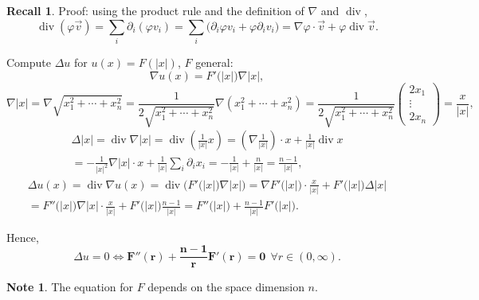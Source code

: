 \documentclass[12pt]{article}
\DeclareMathOperator{\diver}{div}
\theoremstyle{definition}
\newtheorem*{note}{Note}
\newtheorem*{recall}{Recall}
\begin{document}
\begin{recall}
Proof: using the product rule and the definition of $\nabla$ and $\diver$,
\[\diver(\varphi\vec v)=\sum_i\partial_i(\varphi v_i)=\sum_i\big(\partial_i\varphi v_i+\varphi\partial_iv_i\big)=\nabla\varphi\cdot\vec v+\varphi\diver\vec v.\]
\end{recall}

Compute $\Delta u$ for $u(x)=F(|x|)$, $F$ general:
\[\nabla u(x)=F'\big(|x|\big)\nabla|x|,\]
\[\nabla|x|=\nabla\sqrt{x_1^2+\cdots+x_n^2}=\frac1{2\sqrt{x_1^2+\cdots+x_n^2}}\nabla(x_1^2+\cdots+x_n^2)=\frac1{2\sqrt{x_1^2+\cdots+x_n^2}}\left(\begin{matrix}2x_1\\\vdots\\2x_n\end{matrix}\right)=\frac x{|x|},\]
\begin{multline*}
\Delta|x|=\diver\nabla|x|=\diver\left(\frac1{|x|}x\right)=\left(\nabla\frac1{|x|}\right)\cdot x+\frac1{|x|}\diver x\\
=-\frac1{|x|^2}\nabla|x|\cdot x+\frac1{|x|}\sum_i\partial_ix_i=-\frac1{|x|}+\frac n{|x|}=\frac{n-1}{|x|},
\end{multline*}
\begin{multline*}
\Delta u(x)=\diver\nabla u(x)=\diver\big(F'\big(|x|\big)\nabla|x|\big)=\nabla F'\big(|x|\big)\cdot\frac x{|x|}+F'\big(|x|\big)\Delta|x|\\
=F''\big(|x|\big)\nabla|x|\cdot\frac x{|x|}+F'\big(|x|\big)\frac{n-1}{|x|}=F''\big(|x|\big)+\frac{n-1}{|x|}F'\big(|x|\big).
\end{multline*}

Hence,
\[\Delta u=0\Longleftrightarrow\boldsymbol{F''(r)+\frac{n-1}rF'(r)=0}\ \ \forall r\in(0,\infty).\]

\begin{note}
The equation for $F$ depends on the space dimension $n$.
\end{note}
\end{document}
